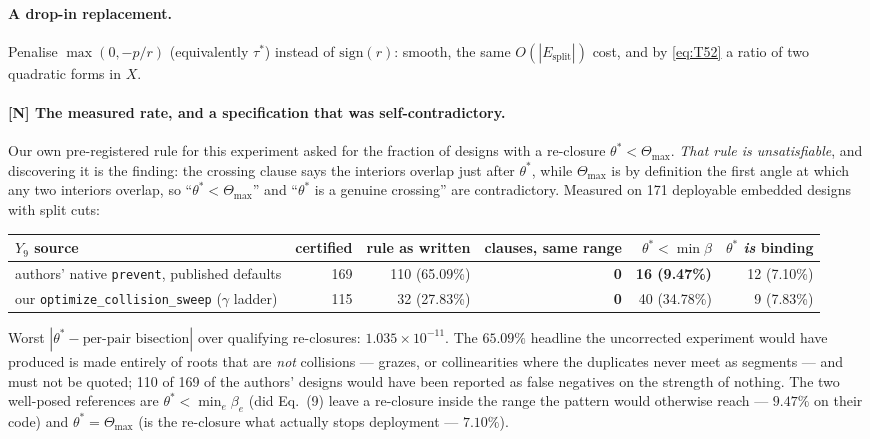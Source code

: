 \documentclass[11pt,a4paper]{article}
\theoremstyle{definition}
\newcommand{\Tmax}{\Theta_{\max}}
\newcommand{\Esplit}{E_{\mathrm{split}}}
\newcommand{\file}[1]{\texttt{\small #1}}
\begin{document}
\paragraph{A drop-in replacement.} Penalise $\max(0,-p/r)$ (equivalently $\tau^*$) instead of
$\mathrm{sign}(r)$: smooth, the same $O(|\Esplit|)$ cost, and by \eqref{eq:T52} a ratio of two
quadratic forms in $X$.

\paragraph{[N] The measured rate, and a specification that was self-contradictory.} Our own
pre-registered rule for this experiment asked for the fraction of designs with a re-closure
$\theta^*<\Tmax$. \emph{That rule is unsatisfiable}, and discovering it is the finding:
the crossing clause says the interiors overlap just after $\theta^*$, while $\Tmax$ is by
definition the first angle at which any two interiors overlap, so ``$\theta^*<\Tmax$'' and
``$\theta^*$ is a genuine crossing'' are contradictory. Measured on 171 deployable embedded
designs with split cuts:

\begin{center}
\small
\begin{tabular}{@{}lrrrrr@{}}
\toprule
$Y_9$ source & certified & rule as written & clauses, same range & $\theta^*<\min\beta$ & $\theta^*$ \emph{is} binding \\
\midrule
authors' native \file{prevent}, published defaults & 169 & 110 (65.09\%) & \textbf{0} & \textbf{16 (9.47\%)} & 12 (7.10\%) \\
our \file{optimize\_collision\_sweep} ($\gamma$ ladder) & 115 & 32 (27.83\%) & \textbf{0} & 40 (34.78\%) & 9 (7.83\%) \\
\bottomrule
\end{tabular}
\end{center}

\noindent Worst $|\theta^*-\text{per-pair bisection}|$ over qualifying re-closures:
$1.035\times10^{-11}$. The $65.09\%$ headline the uncorrected experiment would have produced
is made entirely of roots that are \emph{not} collisions --- grazes, or collinearities where
the duplicates never meet as segments --- and must not be quoted; 110 of 169 of the authors'
designs would have been reported as false negatives on the strength of nothing. The two
well-posed references are $\theta^*<\min_e\beta_e$ (did Eq.~(9) leave a re-closure inside the
range the pattern would otherwise reach --- $\mathbf{9.47\%}$ on their code) and
$\theta^*=\Tmax$ (is the re-closure what actually stops deployment --- $7.10\%$).
\end{document}
